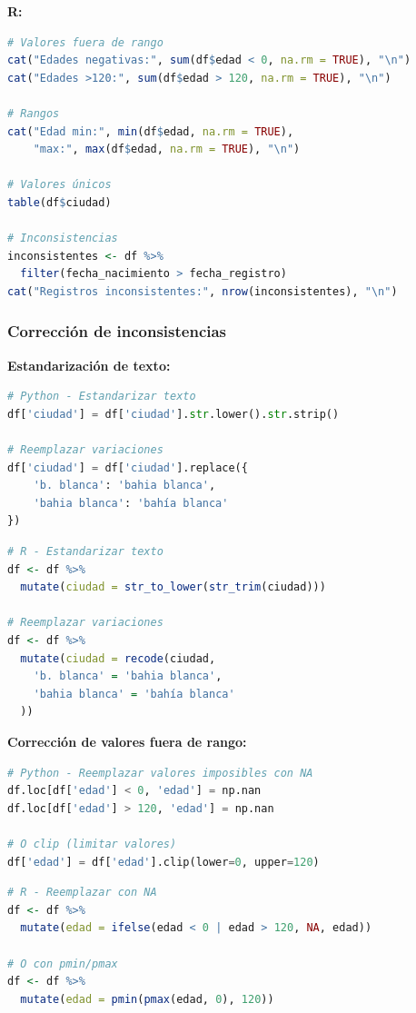 \documentclass[a4paper,11pt]{article}
\begin{document}
\textbf{R:}
\begin{lstlisting}[language=R]
# Valores fuera de rango
cat("Edades negativas:", sum(df$edad < 0, na.rm = TRUE), "\n")
cat("Edades >120:", sum(df$edad > 120, na.rm = TRUE), "\n")

# Rangos
cat("Edad min:", min(df$edad, na.rm = TRUE), 
    "max:", max(df$edad, na.rm = TRUE), "\n")

# Valores únicos
table(df$ciudad)

# Inconsistencias
inconsistentes <- df %>%
  filter(fecha_nacimiento > fecha_registro)
cat("Registros inconsistentes:", nrow(inconsistentes), "\n")
\end{lstlisting}

\subsubsection{Corrección de inconsistencias}

\textbf{Estandarización de texto:}

\begin{lstlisting}[language=Python]
# Python - Estandarizar texto
df['ciudad'] = df['ciudad'].str.lower().str.strip()

# Reemplazar variaciones
df['ciudad'] = df['ciudad'].replace({
    'b. blanca': 'bahia blanca',
    'bahia blanca': 'bahía blanca'
})
\end{lstlisting}

\begin{lstlisting}[language=R]
# R - Estandarizar texto
df <- df %>%
  mutate(ciudad = str_to_lower(str_trim(ciudad)))

# Reemplazar variaciones
df <- df %>%
  mutate(ciudad = recode(ciudad,
    'b. blanca' = 'bahia blanca',
    'bahia blanca' = 'bahía blanca'
  ))
\end{lstlisting}

\textbf{Corrección de valores fuera de rango:}

\begin{lstlisting}[language=Python]
# Python - Reemplazar valores imposibles con NA
df.loc[df['edad'] < 0, 'edad'] = np.nan
df.loc[df['edad'] > 120, 'edad'] = np.nan

# O clip (limitar valores)
df['edad'] = df['edad'].clip(lower=0, upper=120)
\end{lstlisting}

\begin{lstlisting}[language=R]
# R - Reemplazar con NA
df <- df %>%
  mutate(edad = ifelse(edad < 0 | edad > 120, NA, edad))

# O con pmin/pmax
df <- df %>%
  mutate(edad = pmin(pmax(edad, 0), 120))
\end{lstlisting}
\end{document}
